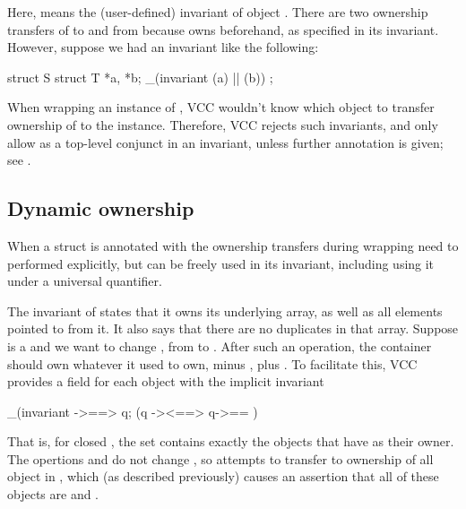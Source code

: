 \noindent
Here,  means the (user-defined) invariant of object .
There are two ownership transfers
of  to and from \vcc{\me} because  owns  beforehand,
as specified in its invariant.
However, suppose we had an invariant like the following:
\begin{VCC}
struct S {
  struct T *a, *b;
  _(invariant \mine(a) || \mine(b))
};
\end{VCC}
When wrapping an instance of , VCC wouldn't know which object
to transfer ownership of to the instance. Therefore, 
VCC rejects such invariants, and only allow 
as a top-level conjunct in an invariant, unless further annotation is given;
see .

\subsection{Dynamic ownership}
\label{sect:dynamic-ownership}

When a struct is annotated with  the ownership transfers
during wrapping need to performed explicitly, but  can
be freely used in its invariant, including using it under a universal
quantifier.


\noindent
The invariant of  states that it owns its underlying array,
as well as all elements pointed to from it.
It also says that there are no duplicates in that array.
Suppose  is a  and 
we want to change ,
from  to .
After such an operation, the container should own whatever it used
to own, minus , plus .
To facilitate this, VCC provides a field \vcc{\owns} for each object
with the implicit invariant
\begin{VCC}
_(invariant \this->\closed ==> \forall \object q;
  (q \in \this->\owns <==> q->\owner == \this)
\end{VCC}

That is, for closed , the set  contains exactly
the objects that have  as their owner.
The opertions  and  do not
change ,
so  attempts to transfer to  ownership of all 
object in , which (as described previously) causes an
assertion that all of these objects are \vcc{\wrapped} and \vcc{\writable}.

